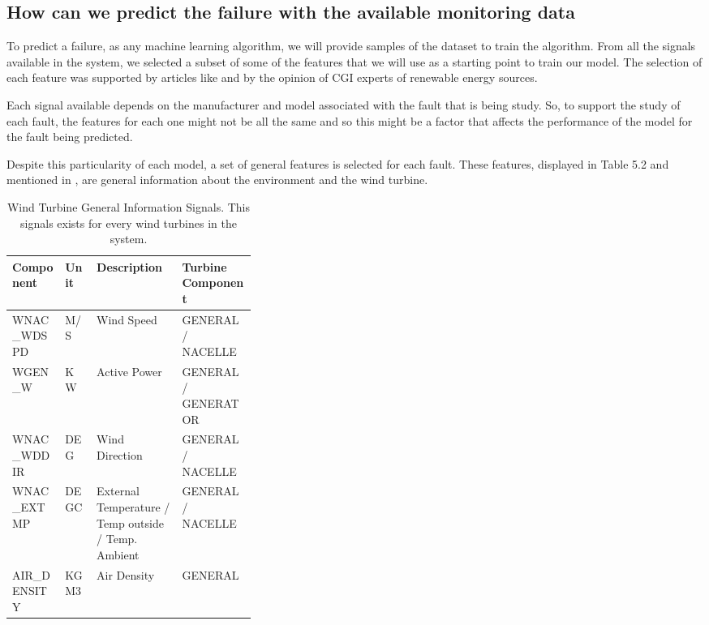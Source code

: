 
\subsection{How can we predict the failure with the available monitoring data} 
\label{sub:if_you_use_this_template} 


To predict a failure, as any machine learning algorithm, we will provide samples of the dataset to train the algorithm. From all the signals available in the system, we selected a subset of some of the features that we will use as a starting point to train our model. The selection of each feature was supported by articles like \cite{OLD_41_WIND} and by the opinion of CGI experts of renewable energy sources.

Each signal available depends on the manufacturer and model associated with the fault that is being study. So, to support the study of each fault, the features for each one might not be all the same and so this might be a factor that affects the performance of the model for the fault being predicted.

Despite this particularity of each model, a set of general features is selected for each fault. These features, displayed in Table 5.2 and mentioned in \cite{OLD_41_WIND}, are general information about the environment and the wind turbine.

\begin{table}[!ht]
    \centering
    \begin{tabular}{|l|l|p{0.35\linewidth}|l|}
    \hline
        Component & Unit & Description & Turbine Component \\ \hline
        WNAC\_WDSPD & M/S & Wind Speed & GENERAL / NACELLE \\ \hline
        WGEN\_W & KW & Active Power & GENERAL / GENERATOR \\ \hline
        WNAC\_WDDIR & DEG & Wind Direction & GENERAL / NACELLE \\ \hline
        WNAC\_EXTMP & DEGC & External Temperature / Temp outside / Temp. Ambient & GENERAL / NACELLE \\ \hline
        AIR\_DENSITY & KGM3 & Air Density & GENERAL \\ \hline
    \end{tabular}
    \caption{Wind Turbine General Information Signals. This signals exists for every wind turbines in the system.}
    \label{GeneralSignals}
\end{table}

